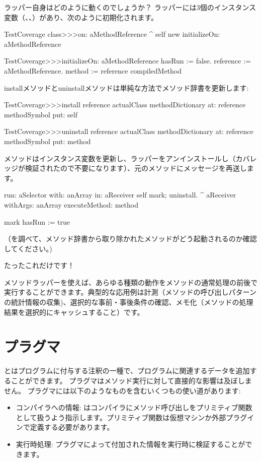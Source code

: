 \documentclass[a4paper,10pt,twoside]{book}
\begin{document}
ラッパー自身はどのように動くのでしょうか？
ラッパーには3個のインスタンス変数（、、）があり、次のように初期化されます。

\begin{code}{}
TestCoverage class>>>on: aMethodReference
	^ self new initializeOn: aMethodReference

TestCoverage>>>initializeOn: aMethodReference
	hasRun := false.
	reference := aMethodReference.
	method := reference compiledMethod
\end{code}

installメソッドとuninstallメソッドは単純な方法でメソッド辞書を更新します:
\begin{code}{}
TestCoverage>>>install
	reference actualClass methodDictionary
		at: reference methodSymbol
		put: self

TestCoverage>>>uninstall
	reference actualClass methodDictionary
		at: reference methodSymbol
		put: method
\end{code}
\noindent
{}メソッドはインスタンス変数を更新し、ラッパーをアンインストールし（カバレッジが検証されたので不要になります）、元のメソッドにメッセージを再送します。
\begin{code}{}
run: aSelector with: anArray in: aReceiver
	self mark; uninstall.
	^ aReceiver withArgs: anArray executeMethod: method

mark
	hasRun := true
\end{code}
（を調べて、メソッド辞書から取り除かれたメソッドがどう起動されるのか確認してください。)

たったこれだけです！

メソッドラッパーを使えば、あらゆる種類の動作をメソッドの通常処理の前後で実行することができます。典型的な応用例は計測（メソッドの呼び出しパターンの統計情報の収集)、選択的な事前・事後条件の確認、メモ化（メソッドの処理結果を選択的にキャッシュすること）です。

\section{プラグマ}

とはプログラムに付与する注釈の一種で、プログラムに関連するデータを追加することができます。
プラグマはメソッド実行に対して直接的な影響は及ぼしません。
プラグマには以下のようなものを含むいくつもの使い道があります:
\begin{itemize}
\item コンパイラへの情報: はコンパイラにメソッド呼び出しをプリミティブ関数として扱うよう指示します。プリミティブ関数は仮想マシンか外部プラグインで定義する必要があります。
\item 実行時処理: プラグマによって付加された情報を実行時に検証することができます。
\end{itemize}
\end{document}
